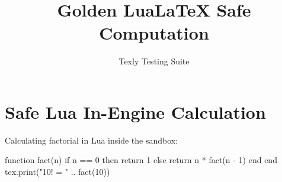 \documentclass{article}
\title{Golden LuaLaTeX Safe Computation}
\author{Texly Testing Suite}
\begin{document}
\maketitle

\section{Safe Lua In-Engine Calculation}
Calculating factorial in Lua inside the sandbox:

\begin{luacode*}
function fact(n)
  if n == 0 then return 1 else return n * fact(n - 1) end
end
tex.print("10! = " .. fact(10))
\end{luacode*}
\end{document}
